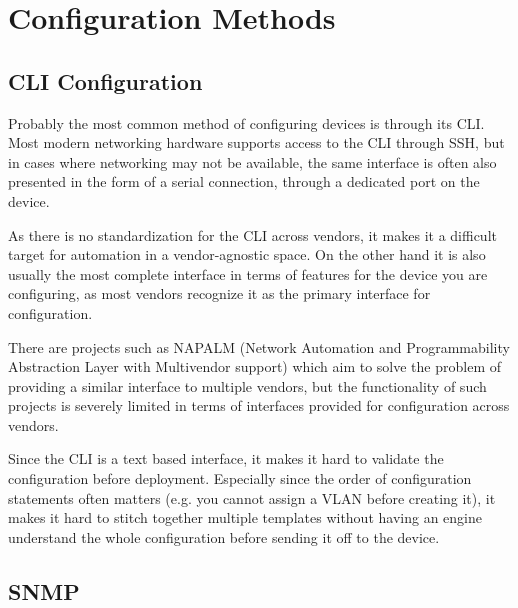 


\section{Configuration Methods}

\subsection{CLI Configuration}

Probably the most common method of configuring devices is through its \acrlong{CLI}. 
Most modern networking hardware supports access to the \acrshort{CLI} through SSH,
but in cases where networking may not be available, the same interface is often also
presented in the form of a serial connection, through a dedicated port on the device.

As there is no standardization for the \acrshort{CLI} across vendors, it makes it a
difficult target for automation in a vendor-agnostic space. On the other hand it
is also usually the most complete interface in terms of features for the device
you are configuring, as most vendors recognize it as the primary interface for configuration\cite{noauthor_configuration_nodate}.

There are projects such as NAPALM (Network Automation and Programmability Abstraction Layer with Multivendor support)\cite{noauthor_napalm_nodate}
which aim to solve the problem of providing a similar interface to multiple vendors,
but the functionality of such projects is severely limited in terms of interfaces provided
for configuration across vendors.

Since the \acrshort{CLI} is a text based interface, it makes it hard to validate the configuration
before deployment. Especially since the order of configuration statements often matters
(e.g. you cannot assign a VLAN before creating it), it makes it hard to stitch together
multiple templates without having an engine understand the whole configuration before sending
it off to the device.

\subsection{SNMP}

